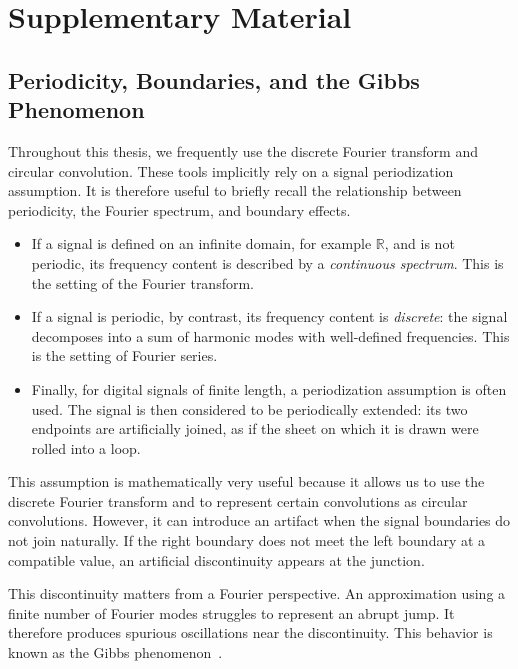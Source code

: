 \chapter{Supplementary Material}

\section{Periodicity, Boundaries, and the Gibbs Phenomenon}
\label{app:periodicite-bords-gibbs}

Throughout this thesis, we frequently use the discrete Fourier transform and circular
convolution. These tools implicitly rely on a signal periodization assumption. It is therefore
useful to briefly recall the relationship between periodicity, the Fourier spectrum, and boundary effects.

\begin{itemize}
    \item If a signal is defined on an infinite domain, for example $\mathbb{R}$, and is not periodic,
    its frequency content is described by a \emph{continuous spectrum}. This is the setting of the Fourier transform.

    \item If a signal is periodic, by contrast, its frequency content is \emph{discrete}:
    the signal decomposes into a sum of harmonic modes with well-defined frequencies.
    This is the setting of Fourier series.

    \item Finally, for digital signals of finite length, a periodization
    assumption is often used. The signal is then considered to be periodically extended: its two endpoints are
    artificially joined, as if the sheet on which it is drawn were rolled into a loop.
\end{itemize}

This assumption is mathematically very useful because it allows us to use the discrete Fourier
transform and to represent certain convolutions as circular convolutions. However, it can
introduce an artifact when the signal boundaries do not join naturally. If the right boundary does not meet the left boundary at a
compatible value, an artificial discontinuity appears at the junction.

This discontinuity matters from a Fourier perspective. An approximation using a finite number of Fourier modes struggles to represent an abrupt
jump. It therefore produces spurious oscillations near
the discontinuity. This behavior is known as the Gibbs phenomenon~\cite{oppenheim2009discrete}.

